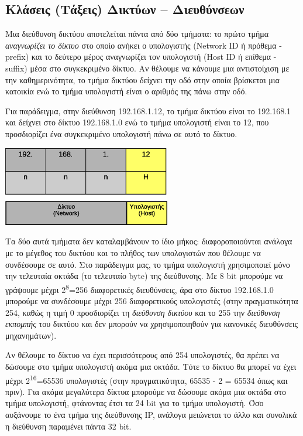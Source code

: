 %
%
\subsection{Κλάσεις (Τάξεις) Δικτύων -- Διευθύνσεων}

Μια διεύθυνση δικτύου αποτελείται πάντα από δύο τμήματα: το πρώτο τμήμα \emph{αναγνωρίζει το δίκτυο} στο οποίο ανήκει ο υπολογιστής (Network ΙD ή πρόθεμα - prefix) και το δεύτερο μέρος αναγνωρίζει τον υπολογιστή (Host ID ή επίθεμα - suffix) μέσα στο συγκεκριμένο δίκτυο. Αν θέλουμε να κάνουμε μια αντιστοίχιση με την καθημερινότητα, το τμήμα δικτύου δείχνει την οδό στην οποία βρίσκεται μια κατοικία ενώ το τμήμα υπολογιστή είναι ο αριθμός της πάνω στην οδό.

Για παράδειγμα, στην διεύθυνση 192.168.1.12, το τμήμα δικτύου είναι το 192.168.1 και δείχνει στο δίκτυο 192.168.1.0 ενώ το τμήμα υπολογιστή είναι το 12, που προσδιορίζει ένα συγκεκριμένο υπολογιστή πάνω σε αυτό το δίκτυο.

\begin{center}
  \includegraphics[width=0.55\textwidth]{images/chapter3/3-2}
\end{center}

Τα δύο αυτά τμήματα δεν καταλαμβάνουν το ίδιο μήκος: διαφοροποιούνται ανάλογα με το μέγεθος του δικτύου και το πλήθος των υπολογιστών που θέλουμε να συνδέσουμε σε αυτό. Στο παράδειγμα μας, το τμήμα υπολογιστή χρησιμοποιεί μόνο την τελευταία οκτάδα (το τελευταίο byte) της διεύθυνσης. Με 8 bit μπορούμε να γράψουμε μέχρι 2\textsuperscript{8}=256 διαφορετικές διευθύνσεις, άρα στο δίκτυο 192.168.1.0 μπορούμε να συνδέσουμε μέχρι 256 διαφορετικούς υπολογιστές (στην πραγματικότητα 254, καθώς η τιμή 0 προσδιορίζει τη \emph{διεύθυνση δικτύου} και το 255 την \emph{διεύθυνση εκπομπής} του δικτύου και δεν μπορούν να χρησιμοποιηθούν για κανονικές διευθύνσεις μηχανημάτων).

Αν θέλουμε το δίκτυο να έχει περισσότερους από 254 υπολογιστές, θα πρέπει να δώσουμε στο τμήμα υπολογιστή ακόμα μια οκτάδα. Τότε το δίκτυο θα μπορεί να έχει μέχρι 2\textsuperscript{16}=65536 υπολογιστές (στην πραγματικότητα, 65535 - 2 = 65534 όπως και πριν). Για ακόμα μεγαλύτερα δίκτυα μπορούμε να δώσουμε ακόμα μια οκτάδα στο τμήμα υπολογιστή, φτάνοντας έτσι τα 24 bit για το τμήμα υπολογιστή.  Όσο αυξάνουμε το ένα τμήμα της διεύθυνσης IP, ανάλογα μειώνεται το άλλο και συνολικά η διεύθυνση παραμένει πάντα 32 bit. 

